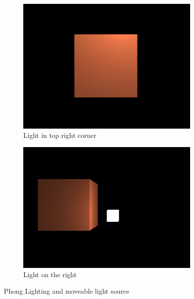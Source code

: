 \documentclass[a4paper, 12pt]{article}
\begin{document}
    \begin{figure}[H]
        \centering
        \begin{subfigure}[b]{0.45\textwidth}
            \centering
            \includegraphics[width=\textwidth]{phongLighting1.png}
            \caption{Light in top right corner}
        \end{subfigure}
        \hfill
        \begin{subfigure}[b]{0.45\textwidth}
            \centering
            \includegraphics[width=\textwidth]{phongLighting2.png}
            \caption{Light on the right}
        \end{subfigure}
        \caption{Phong Lighting and moveable light source}
    \end{figure}
\end{document}
